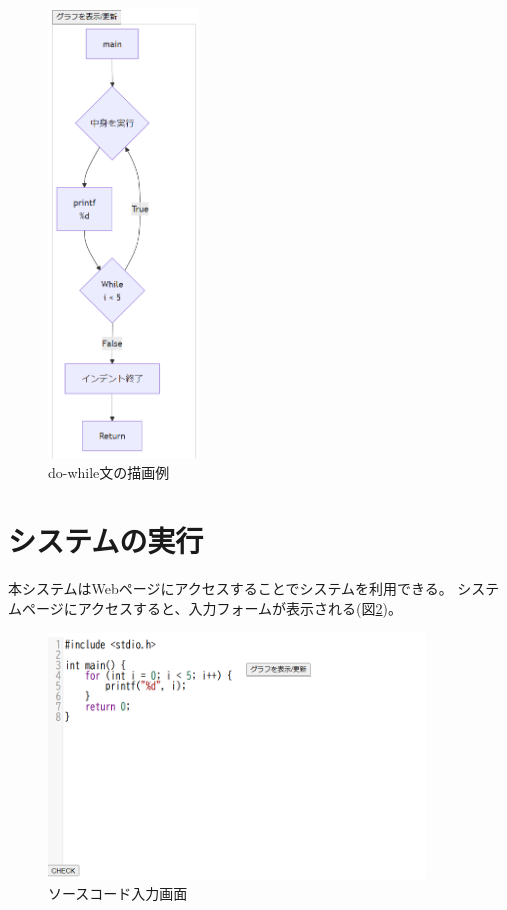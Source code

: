 \documentclass{cssspaper}
\begin{document}
            \begin{figure}[h]
                \centering
                \includegraphics[width=4cm]{dowhile.png}
                \caption{do-while文の描画例}
                \label{fig:dowhile}
            \end{figure}

        \section{システムの実行}
        本システムはWebページにアクセスすることでシステムを利用できる。
        システムページにアクセスすると、入力フォームが表示される(図\ref{fig:systemuse1})。
        
        \begin{figure}[h]
            \centering
            \includegraphics[width=10cm]{systemuse1.png}
            \caption{ソースコード入力画面}
            \label{fig:systemuse1}
        \end{figure}
\end{document}
